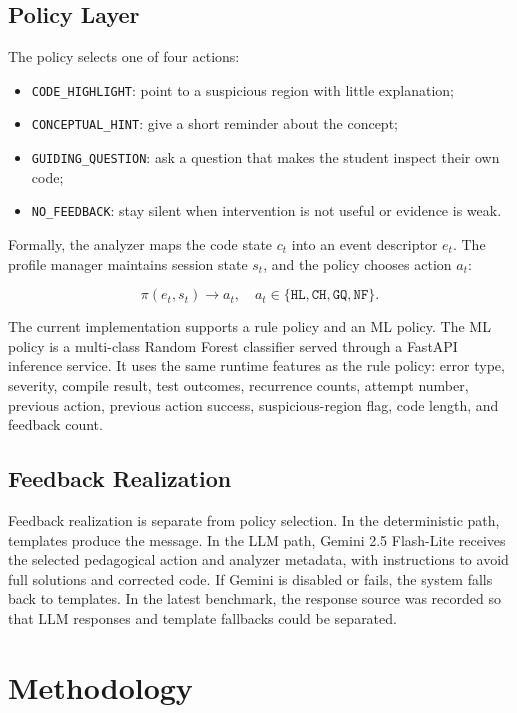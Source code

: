 \documentclass[conference]{IEEEtran}
\begin{document}
\subsection{Policy Layer}

The policy selects one of four actions:

\begin{itemize}
    \item \texttt{CODE\_HIGHLIGHT}: point to a suspicious region with little explanation;
    \item \texttt{CONCEPTUAL\_HINT}: give a short reminder about the concept;
    \item \texttt{GUIDING\_QUESTION}: ask a question that makes the student inspect their own code;
    \item \texttt{NO\_FEEDBACK}: stay silent when intervention is not useful or evidence is weak.
\end{itemize}

Formally, the analyzer maps the code state $c_t$ into an event descriptor $e_t$. The profile manager maintains session state $s_t$, and the policy chooses action $a_t$:

\[
\pi(e_t, s_t) \rightarrow a_t,\quad a_t \in \{\texttt{HL}, \texttt{CH}, \texttt{GQ}, \texttt{NF}\}.
\]

The current implementation supports a rule policy and an ML policy. The ML policy is a multi-class Random Forest classifier served through a FastAPI inference service. It uses the same runtime features as the rule policy: error type, severity, compile result, test outcomes, recurrence counts, attempt number, previous action, previous action success, suspicious-region flag, code length, and feedback count.

\subsection{Feedback Realization}

Feedback realization is separate from policy selection. In the deterministic path, templates produce the message. In the LLM path, Gemini 2.5 Flash-Lite receives the selected pedagogical action and analyzer metadata, with instructions to avoid full solutions and corrected code. If Gemini is disabled or fails, the system falls back to templates. In the latest benchmark, the response source was recorded so that LLM responses and template fallbacks could be separated.

\section{Methodology}
\end{document}
